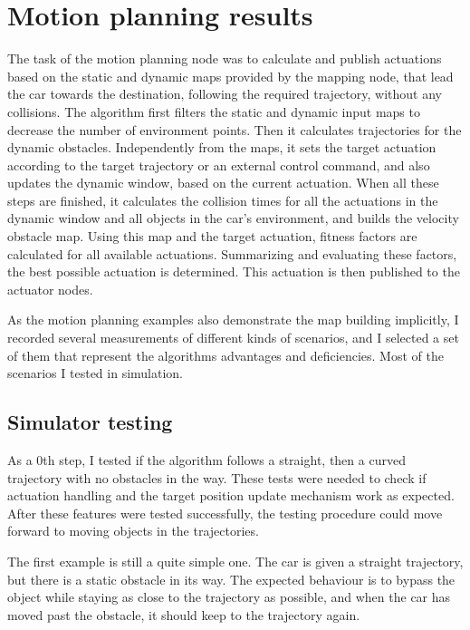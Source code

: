 \section{Motion planning results}
The task of the motion planning node was to calculate and publish actuations based on the static and dynamic maps provided by the mapping node, that lead the car towards the destination, following the required trajectory, without any collisions. The algorithm first filters the static and dynamic input maps to decrease the number of environment points. Then it calculates trajectories for the dynamic obstacles. Independently from the maps, it sets the target actuation according to the target trajectory or an external control command, and also updates the dynamic window, based on the current actuation. When all these steps are finished, it calculates the collision times for all the actuations in the dynamic window and all objects in the car's environment, and builds the velocity obstacle map. Using this map and the target actuation, fitness factors are calculated for all available actuations. Summarizing and evaluating these factors, the best possible actuation is determined. This actuation is then published to the actuator nodes.

As the motion planning examples also demonstrate the map building implicitly, I recorded several measurements of different kinds of scenarios, and I selected a set of them that represent the algorithms advantages and deficiencies. Most of the scenarios I tested in simulation.

\subsection{Simulator testing}
As a 0th step, I tested if the algorithm follows a straight, then a curved trajectory with no obstacles in the way. These tests were needed to check if actuation handling and the target position update mechanism work as expected. After these features were tested successfully, the testing procedure could move forward to moving objects in the trajectories.

The first example is still a quite simple one. The car is given a straight trajectory, but there is a static obstacle in its way. The expected behaviour is to bypass the object while staying as close to the trajectory as possible, and when the car has moved past the obstacle, it should keep to the trajectory again.

